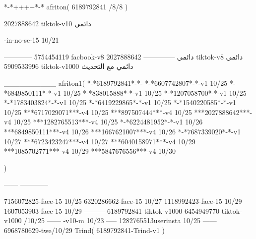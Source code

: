 *-*++++*-*
afriton(
6189792841 /8/8
)

2027888642 tiktok-v10
دائمي


-in-no-se-15 10/21

------------
5754454119 facbook-v8
دائمي
--------------
2027888642 tiktok-v8
دائمي
5909533996 tiktok-v1000
دائمي مع التحديث

__________
afriton1(
*-*6189792841*-*-
*-*6607742807*-*-v1 10/25
*-*6849850111*-*-v1 10/25
*-*838015888*-*-v1 10/25
*-*1207058700*-*-v1 10/25
*-*1783403824*-*-v1 10/25
*-*6419229865*-*-v1 10/25
*-*1540220585*-*-v1 10/25
***6717029071***-v4 10/25
***897507444***-v4 10/25
***2027888642***-v4 10/25
***1282765513***-v4 10/25
*-*6224481952*-*-v1 10/26
***6849850111***-v4 10/26
***1667621007***-v4 10/26
*-*7687339020*-*-v1 10/27
***6723423247***-v4 10/27
***6040158971***-v4 10/29
***1085702771***-v4 10/29
***5847676556***-v4 10/30

)

------
------------

7156072825-face-15 10/25
6320286662-face-15 10/27
1118992423-face-15 10/29
1607053903-face-15 10/29
---------
6189792841 tiktok-v1000
6454949770 tiktok-v1000 /10/25
------
-v10-m 10/23
-----
1282765513userinsta 10/25
------
6968780629-twe/10/29
Trind(
6189792841-Trind-v1 
)
